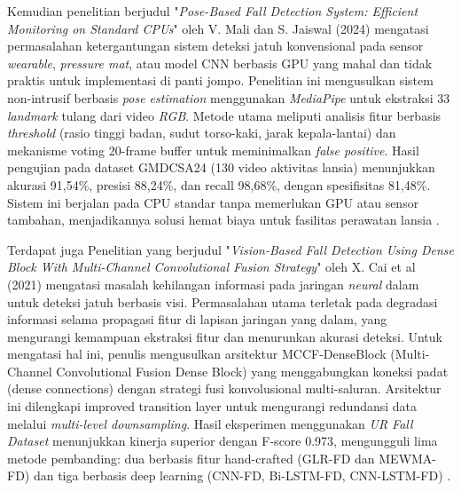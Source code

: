 Kemudian penelitian berjudul "\textit{Pose-Based Fall Detection System: Efficient Monitoring on Standard CPUs}" oleh V. Mali dan S. Jaiswal (2024) mengatasi permasalahan ketergantungan sistem deteksi jatuh konvensional pada sensor \textit{wearable}, \textit{pressure mat}, atau model CNN berbasis GPU yang mahal dan tidak praktis untuk implementasi di panti jompo. Penelitian ini mengusulkan sistem non-intrusif berbasis \textit{pose estimation} menggunakan \textit{MediaPipe} untuk ekstraksi 33 \textit{landmark} tulang dari video \textit{RGB}. Metode utama meliputi analisis fitur berbasis \textit{threshold} (rasio tinggi badan, sudut torso-kaki, jarak kepala-lantai) dan mekanisme voting 20-frame buffer untuk meminimalkan \textit{false positive}. Hasil pengujian pada dataset GMDCSA24 (130 video aktivitas lansia) menunjukkan akurasi 91,54\%, presisi 88,24\%, dan recall 98,68\%, dengan spesifisitas 81,48\%. Sistem ini berjalan pada CPU standar tanpa memerlukan GPU atau sensor tambahan, menjadikannya solusi hemat biaya untuk fasilitas perawatan lansia \cite{Mali2025}. \par

Terdapat juga Penelitian yang berjudul "\textit{Vision-Based Fall Detection Using Dense Block With Multi-Channel Convolutional Fusion Strategy}" oleh X. Cai et al (2021) mengatasi masalah kehilangan informasi pada jaringan \textit{neural} dalam untuk deteksi jatuh berbasis visi. Permasalahan utama terletak pada degradasi informasi selama propagasi fitur di lapisan jaringan yang dalam, yang mengurangi kemampuan ekstraksi fitur dan menurunkan akurasi deteksi. Untuk mengatasi hal ini, penulis mengusulkan arsitektur MCCF-DenseBlock (Multi-Channel Convolutional Fusion Dense Block) yang menggabungkan koneksi padat (dense connections) dengan strategi fusi konvolusional multi-saluran. Arsitektur ini dilengkapi improved transition layer untuk mengurangi redundansi data melalui \textit{multi-level downsampling}. Hasil eksperimen menggunakan \textit{UR Fall Dataset} menunjukkan kinerja superior dengan F-score 0.973, mengungguli lima metode pembanding: dua berbasis fitur hand-crafted (GLR-FD dan MEWMA-FD) dan tiga berbasis deep learning (CNN-FD, Bi-LSTM-FD, CNN-LSTM-FD) \cite{Cai2021}. \par

